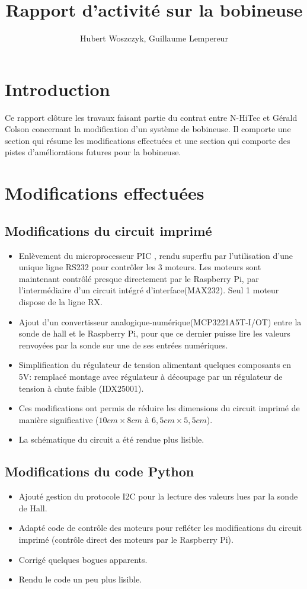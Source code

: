 \documentclass[12pt,a4paper]{article}
\author{Hubert Woszczyk, Guillaume Lempereur}
\title{Rapport d'activité sur la bobineuse}
\begin{document}
\maketitle
\section*{Introduction}
Ce rapport clôture les travaux faisant partie du contrat entre N-HiTec et Gérald Colson concernant la modification d'un système de bobineuse. Il comporte une section qui résume les modifications effectuées et une section qui comporte des pistes d'améliorations futures pour la bobineuse.
 
\section{Modifications effectuées}
\subsection{Modifications du circuit imprimé}
\begin{itemize}\itemsep=6pt
\item Enlèvement du microprocesseur PIC , rendu superflu par l'utilisation d'une unique ligne RS232 pour contrôler les 3 moteurs. Les moteurs sont maintenant contrôlé presque directement par le Raspberry Pi, par l'intermédiaire d'un circuit intégré d'interface(MAX232). Seul 1 moteur dispose de la ligne RX.
\item Ajout d'un convertisseur analogique-numérique(MCP3221A5T-I/OT) entre la sonde de hall et le Raspberry Pi, pour que ce dernier puisse lire les valeurs renvoyées par la sonde sur une de ses entrées numériques. 
\item Simplification du régulateur de tension alimentant quelques composants en 5V: remplacé montage avec régulateur à découpage par un régulateur de tension à chute faible (IDX25001).
\item Ces modifications ont permis de réduire les dimensions du circuit imprimé de manière significative ($10cm \times 8cm$ à $6,5 cm\times 5,5 cm$).
\item La schématique du circuit a été rendue plus lisible.
\end{itemize}

\subsection{Modifications du code Python}
\begin{itemize}\itemsep=6pt
\item Ajouté gestion du protocole I2C pour la lecture des valeurs lues par la sonde de Hall.
\item Adapté code de contrôle des moteurs pour refléter les modifications du circuit imprimé (contrôle direct des moteurs par le Raspberry Pi).
\item Corrigé quelques bogues apparents.
\item Rendu le code un peu plus lisible.
\end{itemize}
\end{document}
